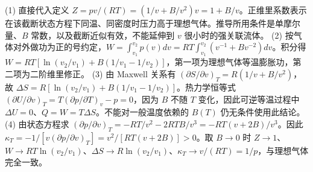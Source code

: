 (1) 直接代入定义 \(Z=pv/(RT)=(1/v+B/v^2)v=1+B/v\)。正维里系数表示在该截断状态方程下同温、同密度时压力高于理想气体。推导所用条件是单摩尔量、\(B\) 常数，以及截断近似有效，不能延伸到 \(v\) 很小时的强关联流体。
(2) 按气体对外做功为正的号约定，\(W=\int_{v_1}^{v_2}p(v)dv=RT\int_{v_1}^{v_2}(v^{-1}+Bv^{-2})dv\)。积分得 \(W=RT\left[\ln(v_2/v_1)+B(1/v_1-1/v_2)\right]\)，第一项为理想气体等温膨胀功，第二项为二阶维里修正。
(3) 由 Maxwell 关系有 \((\partial S/\partial v)_T=R(1/v+B/v^2)\)，故 \(\Delta S=R[\ln(v_2/v_1)+B(1/v_1-1/v_2)]\)。热力学恒等式 \((\partial U/\partial v)_T=T(\partial p/\partial T)_v-p=0\)，因为 \(B\) 不随 \(T\) 变化，因此可逆等温过程中 \(\Delta U=0\)、\(Q=W=T\Delta S\)。不能对一般温度依赖的 \(B(T)\) 仍无条件使用此结论。
(4) 由状态方程求 \((\partial p/\partial v)_T=-RT/v^2-2RTB/v^3=-RT(v+2B)/v^3\)。因此 \(\kappa_T=-1/[v(\partial p/\partial v)_T]=v^2/[RT(v+2B)]>0\)。取 \(B\to0\) 时 \(Z\to1\)、\(W\to RT\ln(v_2/v_1)\)、\(\Delta S\to R\ln(v_2/v_1)\)、\(\kappa_T\to v/(RT)=1/p\)，与理想气体完全一致。
